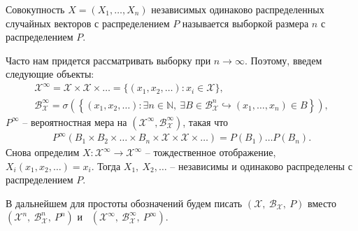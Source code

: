 \begin{definition}
	Совокупность $\displaystyle X=( X_{1} ,\dotsc ,X_{n})$ независимых одинаково распределенных случайных векторов с распределением $\displaystyle P$ называется выборкой размера $\displaystyle n$ с распределением $\displaystyle P$.
\end{definition}
Часто нам придется рассматривать выборку при $\displaystyle n\rightarrow \infty $. Поэтому, введем следующие объекты: 
\begin{gather*}
    \mathcal{X}^{\infty } =\mathcal{X} \times \mathcal{X} \times \dotsc =\{( x_{1} ,x_{2} ,\dotsc ) :x_{i} \in \mathcal{X}\},\\ \displaystyle \mathcal{B}_{\mathcal{X}}^{\infty } =\sigma \left(\left\{( x_{1} ,x_{2} ,\dotsc ) :\exists n\in \mathbb{N} ,\ \exists B\in \mathcal{B}_{\mathcal{X}}^{n} \hookrightarrow ( x_{1} ,\dotsc ,x_{n}) \in B\right\}\right),
\end{gather*}
$\displaystyle P^{\infty }$ -- вероятностная мера на $\displaystyle \left(\mathcal{X}^{\infty } ,\mathcal{B}_{\mathcal{X}}^{\infty }\right)$, такая что 
\begin{gather*}
    P^{\infty }( B_{1} \times B_{2} \times \dotsc \times B_{n} \times \mathcal{X} \times \mathcal{X} \times \dotsc ) =P( B_{1}) \dotsc P( B_{n}).
\end{gather*}
Снова определим $\displaystyle X:\mathcal{X}^{\infty }\rightarrow \mathcal{X}^{\infty }$ -- тождественное отображение, $\displaystyle X_{i}( x_{1} ,x_{2} ,\dotsc ) =x_{i}$. Тогда $\displaystyle X_{1},\ X_{2} ,\dotsc $ -- независимы и одинаково распределены с распределением $\displaystyle P$.

В дальнейшем для простоты обозначений будем писать $\displaystyle (\mathcal{X},\ \mathcal{B}_{\mathcal{X}},\ P)$ вместо $\displaystyle \left(\mathcal{X}^{n},\ \mathcal{B}_{\mathcal{X}}^{n},\ P^{n}\right)$ и \ $\displaystyle \left(\mathcal{X}^{\infty },\ \mathcal{B}_{\mathcal{X}}^{\infty },\ P^{\infty }\right)$.

